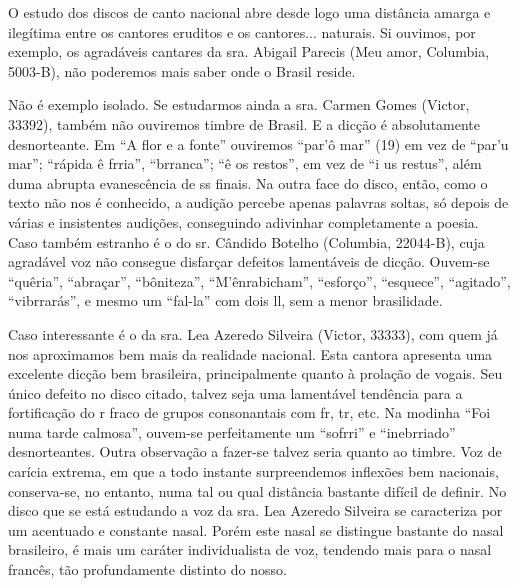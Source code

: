 O estudo dos discos de canto nacional abre desde logo uma distância
amarga e ilegítima entre os cantores eruditos e os cantores... naturais.
Si ouvimos, por exemplo, os agradáveis cantares da sra. Abigail Parecis
(Meu amor, Columbia, 5003-B), não poderemos mais saber onde o Brasil
reside.

Não é exemplo isolado. Se estudarmos ainda a sra. Carmen Gomes (Victor,
33392), também não ouviremos timbre de Brasil. E a dicção é
absolutamente desnorteante. Em ``A flor e a fonte'' ouviremos ``par'ô
mar'' (19) em vez de ``par'u mar''; ``rápida ê frria'', ``brranca''; ``ê
os restos'', em vez de ``i us restus'', além duma abrupta evanescência
de ss finais. Na outra face do disco, então, como o texto não nos é
conhecido, a audição percebe apenas palavras soltas, só depois de várias
e insistentes audições, conseguindo adivinhar completamente a poesia.
Caso também estranho é o do sr. Cândido Botelho (Columbia, 22044-B),
cuja agradável voz não consegue disfarçar defeitos lamentáveis de
dicção. Ouvem-se ``quêria'', ``abraçar'', ``bôniteza'',
``M'ênrabicham'', ``esforço'', ``esquece'', ``agitado'', ``vibrrarás'',
e mesmo um ``fal-la'' com dois ll, sem a menor brasilidade.

Caso interessante é o da sra. Lea Azeredo Silveira (Victor, 33333), com
quem já nos aproximamos bem mais da realidade nacional. Esta cantora
apresenta uma excelente dicção bem brasileira, principalmente quanto à
prolação de vogais. Seu único defeito no disco citado, talvez seja uma
lamentável tendência para a fortificação do r fraco de grupos
consonantais com fr, tr, etc. Na modinha ``Foi numa tarde calmosa'',
ouvem-se perfeitamente um ``sofrri'' e ``inebrriado'' desnorteantes.
Outra observação a fazer-se talvez seria quanto ao timbre. Voz de
carícia extrema, em que a todo instante surpreendemos inflexões bem
nacionais, conserva-se, no entanto, numa tal ou qual distância bastante
difícil de definir. No disco que se está estudando a voz da sra. Lea
Azeredo Silveira se caracteriza por um acentuado e constante nasal.
Porém este nasal se distingue bastante do nasal brasileiro, é mais um
caráter individualista de voz, tendendo mais para o nasal francês, tão
profundamente distinto do nosso.

